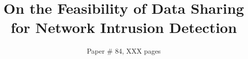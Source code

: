 \documentclass[10pt,sigconf,letterpaper,anonymous]{acmart}
\begin{document}
\title{On the Feasibility of Data Sharing for Network Intrusion Detection}

\subtitle{Paper \# 84, XXX pages}




\maketitle











\appendix


\end{document}
